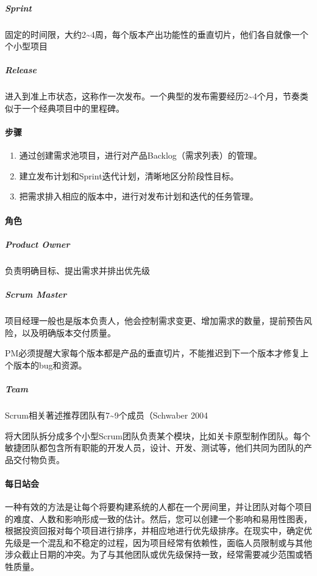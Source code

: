 \documentclass[letterpaper,11pt,english]{sphinxmanual}
\begin{document}
\subparagraph{Sprint}
\label{\detokenize{chapter_project/Scrum:sprint}}
固定的时间限，大约2\textasciitilde{}4周，每个版本产出功能性的垂直切片，他们各自就像一个个小型项目


\subparagraph{Release}
\label{\detokenize{chapter_project/Scrum:release}}
进入到准上市状态，这称作一次发布。一个典型的发布需要经历2\textasciitilde{}4个月，节奏类似于一个经典项目中的里程碑。


\paragraph{步骤}
\label{\detokenize{chapter_project/Scrum:id2}}\begin{enumerate}
%
\item {} 
通过创建需求池项目，进行对产品Backlog（需求列表）的管理。

\item {} 
建立发布计划和Sprint迭代计划，清晰地区分阶段性目标。

\item {} 
把需求排入相应的版本中，进行对发布计划和迭代的任务管理。

\end{enumerate}


\paragraph{角色}
\label{\detokenize{chapter_project/Scrum:id3}}

\subparagraph{Product Owner}
\label{\detokenize{chapter_project/Scrum:product-owner}}
负责明确目标、提出需求并排出优先级


\subparagraph{Scrum Master}
\label{\detokenize{chapter_project/Scrum:scrum-master}}
项目经理一般也是版本负责人，他会控制需求变更、增加需求的数量，提前预告风险，以及明确版本交付质量。

PM必须提醒大家每个版本都是产品的垂直切片，不能推迟到下一个版本才修复上个版本的bug和资源。


\subparagraph{Team}
\label{\detokenize{chapter_project/Scrum:team}}
Scrum相关著述推荐团队有7\textasciitilde{}9个成员（Schwaber 2004

将大团队拆分成多个小型Scrum团队负责某个模块，比如关卡原型制作团队。每个敏捷团队都包含所有职能的开发人员，设计、开发、测试等，他们共同为团队的产品交付物负责。


\paragraph{每日站会}
\label{\detokenize{chapter_project/Scrum:id4}}
一种有效的方法是让每个将要构建系统的人都在一个房间里，并让团队对每个项目的难度、人数和影响形成一致的估计。然后，您可以创建一个影响和易用性图表，根据投资回报对每个项目进行排序，并相应地进行优先级排序。在现实中，确定优先级是一个混乱和不稳定的过程，因为项目经常有依赖性，面临人员限制或与其他涉众截止日期的冲突。为了与其他团队或优先级保持一致，经常需要减少范围或牺牲质量。
\end{document}
